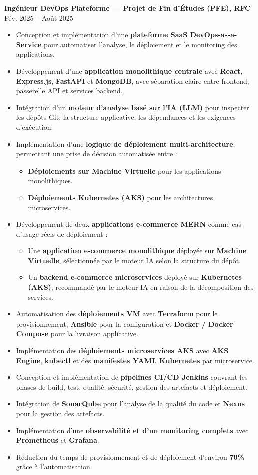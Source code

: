 \documentclass[10pt, letterpaper]{article}
\newenvironment{highlights}{
\begin{itemize}[leftmargin=12pt, itemsep=2pt]
}{
\end{itemize}
}
\begin{document}
\textbf{Ingénieur DevOps Plateforme --- Projet de Fin d'Études (PFE), RFC} \hfill Fév. 2025 -- Août 2025
\begin{highlights}
\item Conception et implémentation d'une \textbf{plateforme SaaS DevOps-as-a-Service} pour automatiser l'analyse, le déploiement et le monitoring des applications.
\item Développement d'une \textbf{application monolithique centrale} avec \textbf{React}, \textbf{Express.js}, \textbf{FastAPI} et \textbf{MongoDB}, avec séparation claire entre frontend, passerelle API et services backend.
\item Intégration d'un \textbf{moteur d'analyse basé sur l'IA (LLM)} pour inspecter les dépôts Git, la structure applicative, les dépendances et les exigences d'exécution.
\item Implémentation d'une \textbf{logique de déploiement multi-architecture}, permettant une prise de décision automatisée entre :
\begin{itemize}[leftmargin=16pt, itemsep=2pt]
  \item \textbf{Déploiements sur Machine Virtuelle} pour les applications monolithiques.
  \item \textbf{Déploiements Kubernetes (AKS)} pour les architectures microservices.
\end{itemize}
\item Développement de deux \textbf{applications e-commerce MERN} comme cas d'usage réels de déploiement :
\begin{itemize}[leftmargin=16pt, itemsep=2pt]
  \item Une \textbf{application e-commerce monolithique} déployée sur \textbf{Machine Virtuelle}, sélectionnée par le moteur IA selon la structure du dépôt.
  \item Un \textbf{backend e-commerce microservices} déployé sur \textbf{Kubernetes (AKS)}, recommandé par le moteur IA en raison de la décomposition des services.
\end{itemize}
\item Automatisation des \textbf{déploiements VM} avec \textbf{Terraform} pour le provisionnement, \textbf{Ansible} pour la configuration et \textbf{Docker / Docker Compose} pour la livraison applicative.
\item Implémentation des \textbf{déploiements microservices AKS} avec \textbf{AKS Engine}, \textbf{kubectl} et des \textbf{manifestes YAML Kubernetes} par microservice.
\item Conception et implémentation de \textbf{pipelines CI/CD Jenkins} couvrant les phases de build, test, qualité, sécurité, gestion des artefacts et déploiement.
\item Intégration de \textbf{SonarQube} pour l'analyse de la qualité du code et \textbf{Nexus} pour la gestion des artefacts.
\item Implémentation d'une \textbf{observabilité et d'un monitoring complets} avec \textbf{Prometheus} et \textbf{Grafana}.
\item Réduction du temps de provisionnement et de déploiement d'environ \textbf{70\%} grâce à l'automatisation.
\end{highlights}
\end{document}
